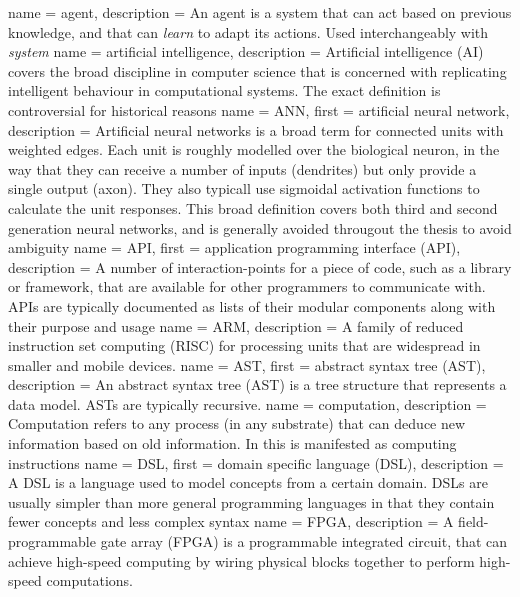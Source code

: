  {
  name = agent,
  description = {An agent is a system that can act based on previous knowledge,
		 and that can \textit{learn} to adapt its actions.
	         Used interchangeably with \textit{system}}
}
 {
    name = artificial intelligence,
    description = {Artificial intelligence (AI) covers the broad discipline in computer science
that is concerned with replicating intelligent behaviour in computational systems. The exact
definition is controversial for historical reasons \autocite{Nilsson2009}}
}
 {
  name = ANN,
  first = {artificial neural network},
  description = {
    Artificial neural networks is a broad term for connected units with 
    weighted edges.
    Each unit is roughly modelled over the biological neuron, in the way 
    that they can receive a number of inputs (dendrites) 
    but only provide a single output (axon).
    They also typicall use sigmoidal activation functions to calculate the 
    unit responses.
    This broad definition covers both third and second generation neural
    networks, and is generally avoided througout the thesis to avoid 
    ambiguity}
}
 {
  name = API,
  first = {application programming interface (API)},
  description = {A number of interaction-points for a piece of code,
		 such as a library or framework, that are available for
		 other programmers to communicate with. APIs are typically
		 documented as lists of their modular components along
		 with their purpose and usage}
}
 {
  name = {ARM},
  description = {A family of reduced instruction set computing (RISC) for 
                 processing units that are widespread in smaller and mobile
		 devices.}
}
 {
  name = {AST},
  first = {abstract syntax tree (AST)},
  description = {An abstract syntax tree (AST) is a tree structure that 
                 represents a data model. ASTs are typically recursive.}
}
 {
   name = computation,
   description = {Computation refers to any process (in any
substrate) that can deduce new information based on old information. In
this is manifested as computing instructions}
}
 {
  name = {DSL},
  first = {domain specific language (DSL)},
  description = {A DSL is a language used to model concepts from a certain
    domain. DSLs are usually simpler than more general programming languages in
    that they contain fewer concepts and less complex syntax}
}
 {
  name = {FPGA},
  description = {A field-programmable gate array (FPGA) is a programmable
		 integrated circuit, that can achieve high-speed computing
		 by wiring physical blocks together to perform high-speed
		 computations.}
}

